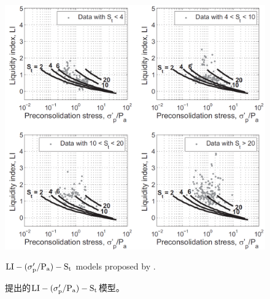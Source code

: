 \begin{figure}[!p]
\begin{minipage}[t]{0.48\textwidth}
        \includegraphics[width=\textwidth]{figures/figure-5.png}
        \caption{$\rm{LI}-(\sigma_p'/P_a)-S_t$ models proposed by \citet{NAVFAC1982}.}
        \vspace{-5pt}
        \addtocounter{figure}{-1}
        \renewcommand{\figurename}{图}
        \caption{\citet{NAVFAC1982}提出的$\rm{LI}-(\sigma_p'/P_a)-S_t$模型。}
        \renewcommand{\figurename}{Figure}
    \end{minipage}
\end{figure}

